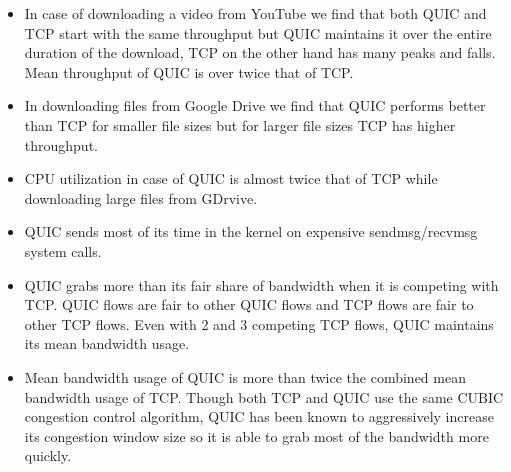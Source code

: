 \begin{frame}
\begin{itemize}
\item In case of downloading a video from YouTube we find that both QUIC and TCP start  with the same throughput but QUIC maintains it over the entire duration of the download, TCP on the other hand has many peaks and falls. Mean throughput of QUIC is over twice that of TCP.%

\item In downloading files from Google Drive we find that QUIC performs better than TCP for smaller file sizes but for larger file sizes TCP has higher throughput.

\item CPU utilization in case of QUIC is almost twice that of TCP while downloading large files from GDrvive.

\item QUIC sends most of its time in the kernel on expensive sendmsg/recvmsg system calls. 

\item QUIC grabs more than its fair share of bandwidth when it is competing with TCP. QUIC flows are fair to other QUIC flows and TCP flows are fair to other TCP flows. Even with 2 and 3 competing TCP flows, QUIC maintains its mean bandwidth usage.

\item Mean bandwidth usage of QUIC is more than twice the combined mean bandwidth usage of TCP. Though both TCP and QUIC use the same CUBIC congestion control algorithm, QUIC has been known to aggressively increase its congestion window size so it is able to grab most of the bandwidth more quickly. 

\end{itemize}
\end{frame}
\clearpage



